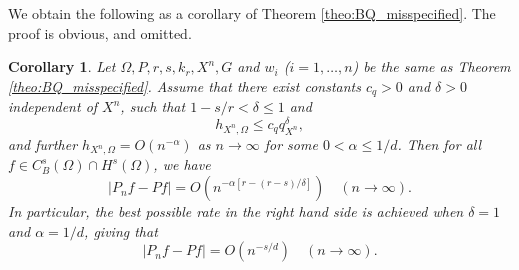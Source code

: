 \documentclass[11pt]{article}
\newtheorem{corollary}[theorem]{Corollary}
\theoremstyle{remark}
\theoremstyle{example}
\theoremstyle{remark}
\begin{document}
We obtain the following as a corollary of Theorem \ref{theo:BQ_misspecified}. The proof is obvious, and omitted. 
\begin{corollary} \label{coro:BQ_misspecified_rate}
Let $\Omega, P, r, s, k_r, X^n, G$ and $w_i$ ($i=1,\ldots,n$) be the same as Theorem \ref{theo:BQ_misspecified}. 
Assume that there exist constants $c_q > 0$ and $\delta > 0$ independent of $X^n$, such that $1- s/r < \delta \leq 1$ and
\[
h_{X^n,\Omega} \leq c_q q_{X^n}^\delta, 
\]
and further $h_{X^n,\Omega} = O(n^{- \alpha})$ as $n \to \infty$ for some $0 < \alpha \leq 1/d$. 
Then for all $f \in C_B^s (\Omega) \cap H^s (\Omega)$, we have
\begin{equation} \label{eq:BQ_misspecified_rate_gen}
\left| P_n f - Pf \right| = O(n^{  - \alpha [ r - (r-s)/\delta ]  }) \quad (n \to \infty).
\end{equation}
In particular, the best possible rate in the right hand side is achieved when $\delta = 1$ and $\alpha = 1/d$, giving that
\begin{equation} \label{eq:BQ_misspecified_rate}
\left| P_n f - Pf \right| = O(n^{  - s/d }) \quad (n \to \infty).
\end{equation}%
\end{corollary}
\begin{comment}
\begin{proof}
From Theorem \ref{theo:BQ_misspecified}, there exist positive constants $C$ and $h_0$ independent of $X^n$ and $f$, such that
\begin{equation*}
\left| P_n f - Pf \right| \leq C  \max \left(  \| f \|_{C_B^s(\Omega)}, \| f \|_{H^s(\Omega)}  \right)  h_{X^n,\Omega}^{s - (1 - \delta) r},
\end{equation*}
provided that $h_{X^n,\Omega} \leq h_0$.
This condition $h_{X^n,\Omega} \leq h_0$ is satisfied for large enough $n$ since we have the assumption that $h_{X^n,\Omega} = O(n^{-1/d})$ as $n \to \infty$.
Using this assumption in the above inequality completes the proof.
\end{proof}
\end{comment}
\end{document}
